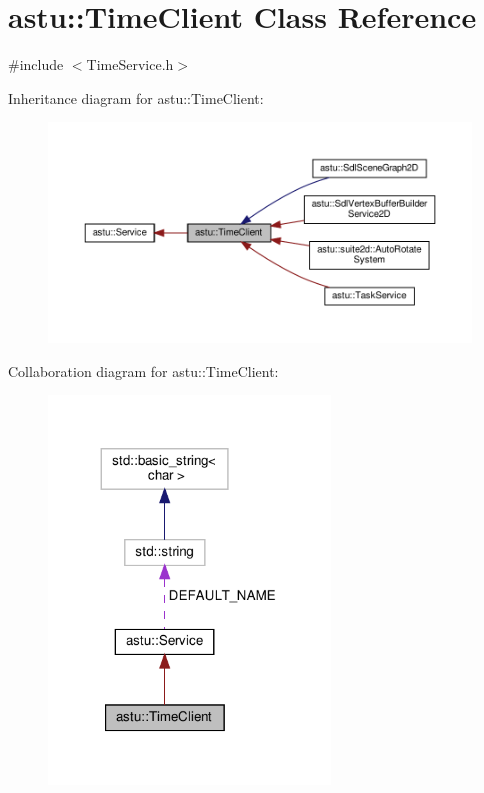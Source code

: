 \hypertarget{classastu_1_1TimeClient}{}\section{astu\+:\+:Time\+Client Class Reference}
\label{classastu_1_1TimeClient}


{\ttfamily \#include $<$Time\+Service.\+h$>$}



Inheritance diagram for astu\+:\+:Time\+Client\+:\nopagebreak
\begin{figure}[H]
\begin{center}
\leavevmode
\includegraphics[width=350pt]{classastu_1_1TimeClient__inherit__graph}
\end{center}
\end{figure}


Collaboration diagram for astu\+:\+:Time\+Client\+:\nopagebreak
\begin{figure}[H]
\begin{center}
\leavevmode
\includegraphics[width=212pt]{classastu_1_1TimeClient__coll__graph}
\end{center}
\end{figure}
